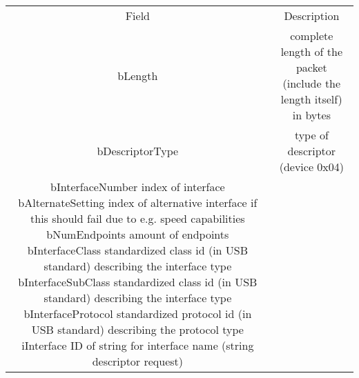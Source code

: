 \begin{tabular}{c|c}
Field & Description \\
bLength &  complete length of the packet (include the length itself) in bytes \\
bDescriptorType &  type of descriptor (device 0x04) \\
bInterfaceNumber
index of interface
bAlternateSetting
index of alternative interface if this should fail due to e.g. speed capabilities
bNumEndpoints
amount of endpoints
bInterfaceClass
standardized class id (in USB standard) describing the interface type
bInterfaceSubClass
standardized class id (in USB standard) describing the interface type
bInterfaceProtocol
standardized protocol id (in USB standard) describing the protocol type
iInterface
ID of string for interface name (string descriptor request)
\end{tabular}

